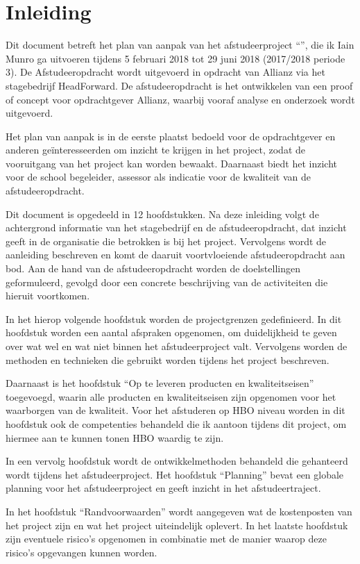\chapter{Inleiding}
Dit document betreft het plan van aanpak van het afstudeerproject ``\thesisTitle'', die ik Iain Munro ga uitvoeren tijdens 5 februari 2018 tot 29 juni 2018 (2017/2018 periode 3). De Afstudeeropdracht wordt uitgevoerd in opdracht van Allianz via het stagebedrijf HeadForward. De afstudeeropdracht is het ontwikkelen van een proof of concept voor opdrachtgever Allianz, waarbij vooraf analyse en onderzoek wordt uitgevoerd.\par

Het plan van aanpak is in de eerste plaatst bedoeld voor de opdrachtgever en anderen geïnteresseerden om inzicht te krijgen in het project, zodat de vooruitgang van het project kan worden bewaakt. Daarnaast biedt het inzicht voor de school begeleider, assessor als indicatie voor de kwaliteit van de afstudeeropdracht.\par

Dit document is opgedeeld in 12 hoofdstukken. Na deze inleiding volgt de achtergrond informatie van het stagebedrijf en de afstudeeropdracht, dat inzicht geeft in de organisatie die betrokken is bij het project. Vervolgens wordt de aanleiding beschreven en komt de daaruit voortvloeiende afstudeeropdracht aan bod. Aan de hand van de afstudeeropdracht worden de doelstellingen geformuleerd, gevolgd door een concrete beschrijving van de activiteiten die hieruit voortkomen.\par

In het hierop volgende hoofdstuk worden de projectgrenzen gedefinieerd. In dit hoofdstuk worden een aantal afspraken opgenomen, om duidelijkheid te geven over wat wel en wat niet binnen het afstudeerproject valt. Vervolgens worden de methoden en technieken die gebruikt worden tijdens het project beschreven.\par

Daarnaast is het hoofdstuk ``Op te leveren producten en kwaliteitseisen''  toegevoegd, waarin alle producten en kwaliteitseisen zijn opgenomen voor het waarborgen van de kwaliteit. Voor het afstuderen op HBO niveau worden in dit hoofdstuk ook de competenties behandeld die ik aantoon tijdens dit project, om hiermee aan te kunnen tonen HBO waardig te zijn. \par

In een vervolg hoofdstuk wordt de ontwikkelmethoden behandeld die gehanteerd wordt tijdens het afstudeerproject. Het hoofdstuk ``Planning'' bevat een globale planning voor het afstudeerproject en geeft inzicht in het afstudeertraject.\par

In het hoofdstuk ``Randvoorwaarden'' wordt aangegeven wat de kostenposten van het project zijn en wat het project uiteindelijk oplevert. In het laatste hoofdstuk zijn eventuele risico's opgenomen in combinatie met de manier waarop deze risico's opgevangen kunnen worden.